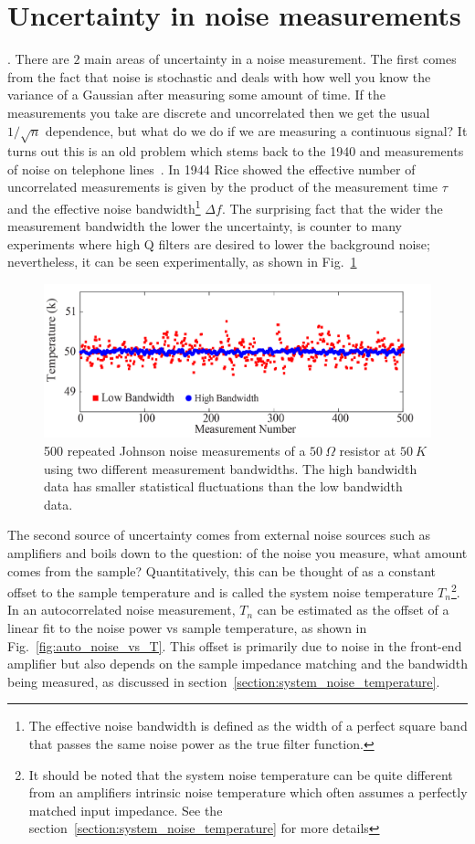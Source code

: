 \section{Uncertainty in noise measurements}
. There are $2$ main areas of uncertainty in a noise measurement. The first comes from the fact that noise is stochastic and deals with how well you know the variance of a Gaussian after measuring some amount of time. If the measurements you take are discrete and uncorrelated then we get the usual $1/\sqrt{n}$ dependence, but what do we do if we are measuring a continuous signal? It turns out this is an old problem which stems back to the 1940 and measurements of noise on telephone lines~\cite{rice_mathematical_1944}. In 1944 Rice showed the effective number of uncorrelated measurements is given by the product of the measurement time $\tau$ and the effective noise bandwidth\footnote{The effective noise bandwidth is defined as the width of a perfect square band that passes the same noise power as the true filter function.} $\Delta f$. The surprising fact that the wider the measurement bandwidth the lower the uncertainty, is counter to many experiments where high Q filters are desired to lower the background noise; nevertheless, it can be seen experimentally, as shown in Fig.~\ref{fig:JNT_500measurements}
\begin{figure}
\centering
\includegraphics[width=120mm]{figures/Johnson_noise_thermometry/500_measurements.png}
\caption{500 repeated Johnson noise measurements of a $50~\Omega$ resistor at $50~K$ using two different measurement bandwidths. The high bandwidth data has smaller statistical fluctuations than the low bandwidth data.}
\label{fig:JNT_500measurements}
\end{figure}

The second source of uncertainty comes from external noise sources such as amplifiers and boils down to the question: of the noise you measure, what amount comes from the sample? Quantitatively, this can be thought of as a constant offset to the sample temperature and is called the system noise temperature $T_n$\footnote{It should be noted that the system noise temperature can be quite different from an amplifiers intrinsic noise temperature which often assumes a perfectly matched input impedance. See the section~\ref{section:system_noise_temperature} for more details}. In an autocorrelated noise measurement, $T_n$ can be estimated as the offset of a linear fit to the noise power vs sample temperature, as shown in Fig.~\ref{fig:auto_noise_vs_T}. This offset is primarily due to noise in the front-end amplifier but also depends on the sample impedance matching and the bandwidth being measured, as discussed in section~\ref{section:system_noise_temperature}.

